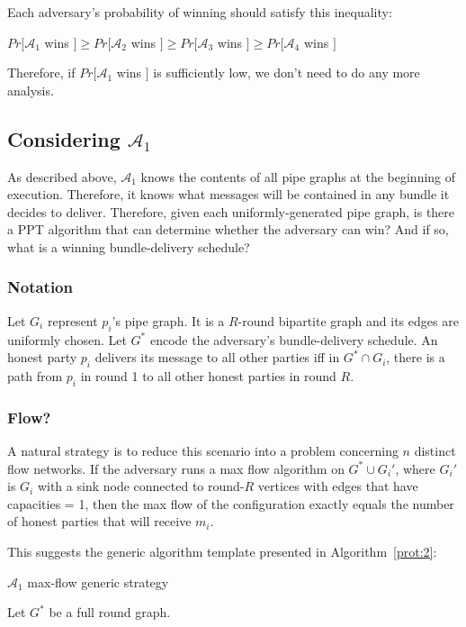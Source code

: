 \documentclass{article}
\begin{document}
Each adversary's probability of winning should satisfy this inequality:
\begin{center}
    $Pr[\mathcal A_1$ wins $] \geq Pr[\mathcal A_2$ wins $] \geq Pr[\mathcal A_3$ wins $] \geq Pr[\mathcal A_4$ wins $]$ 
\end{center}

Therefore, if $Pr[\mathcal A_1$ wins $]$ is sufficiently low, we don't need to do any more analysis.

\subsection{Considering $\mathcal A_1$}
As described above, $\mathcal A_1$ knows the contents of all pipe graphs at the beginning of execution. Therefore, it knows what messages will be contained in any bundle it decides to deliver. Therefore, given each uniformly-generated pipe graph, is there a PPT algorithm that can determine whether the adversary can win? And if so, what is a winning bundle-delivery schedule?
\subsubsection{Notation}
Let $G_i$ represent $p_i$'s pipe graph. It is a $R$-round bipartite graph and its edges are uniformly chosen. 
Let $G^*$ encode the adversary's bundle-delivery schedule. An honest party $p_i$ delivers its message to all other parties iff in $G^* \cap G_i$, there is a path from $p_i$ in round 1 to all other honest parties in round $R$. 
\subsubsection{Flow?}
A natural strategy is to reduce this scenario into a problem concerning $n$ distinct flow networks. If the adversary runs a max flow algorithm on $G^* \cup G_i'$, where $G_i'$ is $G_i$ with a sink node connected to round-$R$ vertices with edges that have capacities = 1, then the max flow of the configuration exactly equals the number of honest parties that will receive $m_i$. 

This suggests the generic algorithm template presented in Algorithm~\ref{prot:2}: 

\begin{algorithm}\label{prot:2}
\caption{$\mathcal A_1$ max-flow generic strategy}



Let $G^*$ be a full round graph.\\

\SetAlgoLined
\SetAlgoNoEnd
\end{algorithm}
\end{document}
